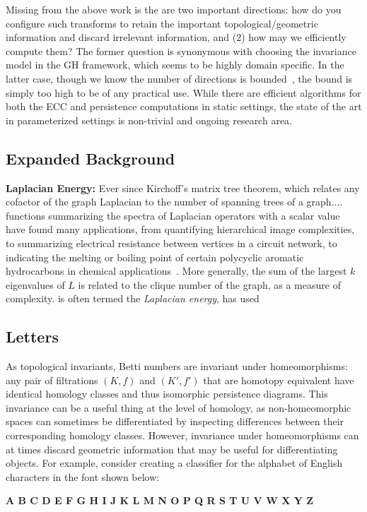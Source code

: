 \documentclass[10pt]{article}
\numberwithin{equation}{section}
\newcommand{\+}{%
	\raisebox{0.18ex}{\scaleobj{0.55}{+}}
}
\theoremstyle{definition}
\theoremstyle{definition}
\begin{document}
 Missing from the above work is the are two important directions: how do you configure such transforms to retain the important topological/geometric information and discard irrelevant information, and (2) how may we efficiently compute them? 
The former question is synonymous with choosing the invariance model in the GH framework, which seems to be highly domain specific. 
 In the latter case, though we know the number of directions is bounded~\cite{}, the bound is simply too high to be of any practical use. While there are efficient algorithms for both the ECC and persistence computations in static settings, the state of the art in parameterized settings is non-trivial and ongoing research area.

\subsection*{Expanded Background}
\textbf{Laplacian Energy:} Ever since Kirchoff's matrix tree theorem, which relates any cofactor of the graph Laplacian to the number of spanning trees of a graph.... functions summarizing the spectra of Laplacian operators with a scalar value have found many applications, from quantifying hierarchical image complexities, to summarizing electrical resistance between vertices in a circuit network, to indicating the melting or boiling point of certain polycyclic aromatic hydrocarbons in chemical applications~\cite{}.
More generally, the sum of the largest $k$ eigenvalues of $L$ is related to the clique number of the graph,  as a measure of complexity.
is often termed the \emph{Laplacian energy}, has used  %

\subsection*{Letters}
As topological invariants, Betti numbers are invariant under homeomorphisms: any pair of filtrations $(K, f)$ and $(K', f')$ that are homotopy equivalent have identical homology classes and thus isomorphic persistence diagrams. 
This invariance can be a useful thing at the level of homology, as non-homeomorphic spaces can sometimes be differentiated by inspecting differences between their corresponding homology classes. 
However, invariance under homeomorphisms can at times discard geometric information that may be useful for differentiating objects.
For example, consider creating a classifier for the alphabet of English characters in the font shown below:
\vspace{0.5em}
\\
\vspace{0.5em}
\begin{ttfamily}
	\selectfont \bfseries
	\hfill A B C D E F G H I J K L M N O P Q R S T U V W X Y Z \hfill 
\end{ttfamily}
\end{document}
